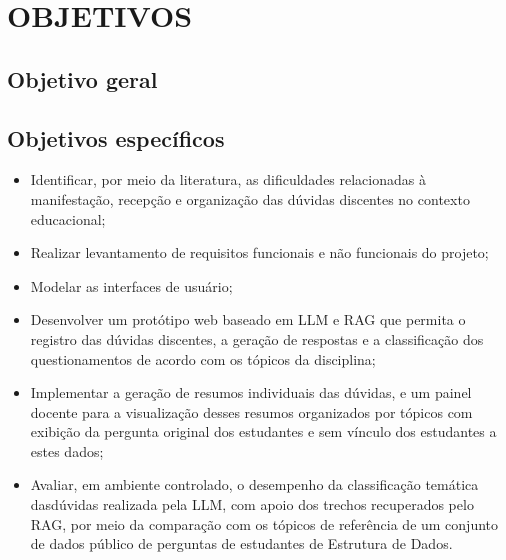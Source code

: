 \section{{\fontsize{12pt}{14pt}\selectfont OBJETIVOS}}

\vspace{-0.3cm}
\subsection{{\fontsize{12pt}{14pt}\selectfont Objetivo geral}}
\subsection{{\fontsize{12pt}{14pt}\selectfont Objetivos específicos}}
\begin{itemize}
    \item Identificar, por meio da literatura, as dificuldades relacionadas à manifestação, recepção e organização das dúvidas discentes no contexto educacional;
    \item Realizar levantamento de requisitos funcionais e não funcionais do projeto;
    \item Modelar as interfaces de usuário;
    \item Desenvolver um protótipo web baseado em LLM e RAG que permita o registro das dúvidas discentes, a geração de respostas e a classificação dos questionamentos de acordo com os tópicos da disciplina;
    \item Implementar a geração de resumos individuais das dúvidas, e um painel docente para a visualização desses resumos organizados por tópicos com exibição da pergunta original dos estudantes e sem vínculo dos estudantes a estes dados;
    \item Avaliar, em ambiente controlado, o desempenho da classificação temática dasdúvidas realizada pela LLM, com apoio dos trechos recuperados pelo RAG, por meio da comparação com os tópicos de referência de um conjunto de dados público de perguntas de estudantes de Estrutura de Dados.
    
\end{itemize}
